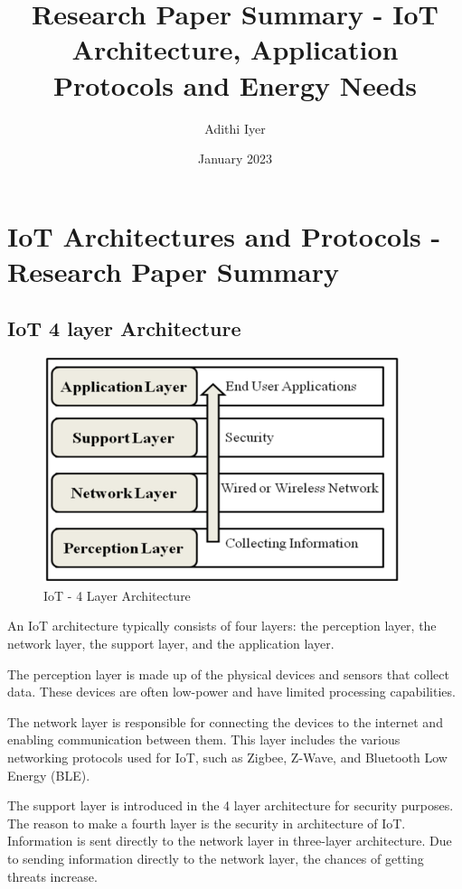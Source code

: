 \documentclass{article}
\title{Research Paper Summary - IoT Architecture, Application Protocols and Energy Needs}
\author{Adithi Iyer}
\date{January 2023}
\begin{document}
\maketitle

\section{IoT Architectures and Protocols - Research Paper Summary}

\subsection{IoT 4 layer Architecture}

\begin{figure}[h!]
    \centering
    \includegraphics[width=\linewidth]{4LayerArch.PNG}
    \caption{IoT - 4 Layer Architecture}
    \label{fig:my_label}
\end{figure}

An IoT architecture typically consists of four layers: the perception layer, the network layer, the support layer, and the application layer.

The perception layer is made up of the physical devices and sensors that collect data. These devices are often low-power and have limited processing capabilities.


The network layer is responsible for connecting the devices to the internet and enabling communication between them. This layer includes the various networking protocols used for IoT, such as Zigbee, Z-Wave, and Bluetooth Low Energy (BLE).


The support layer is introduced in the 4 layer architecture for security purposes. The reason to make a fourth layer is the security in architecture of IoT. Information is sent directly to the network layer in three-layer architecture. Due to sending information directly to the network layer, the chances of getting threats increase.
\end{document}
